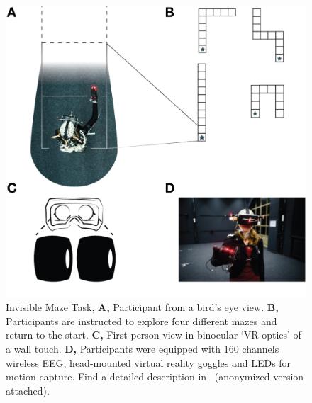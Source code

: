 \begin{figure}[!t]
\centering
\includegraphics[width=\linewidth]{figures/IMT_Task.pdf}
\vspace{6pt}
\caption{Invisible Maze Task, \textbf{A,} Participant from a bird’s eye view. \textbf{B,} Participants are instructed to explore four different mazes and return to the start. \textbf{C,} First-person view in binocular `VR optics' of a wall touch. \textbf{D,} Participants were equipped with 160 channels wireless EEG, head-mounted virtual reality goggles and LEDs for motion capture. Find a detailed description in~\cite{Gehrke2018} (anonymized version attached).}
\label{imt_task}
\end{figure}

